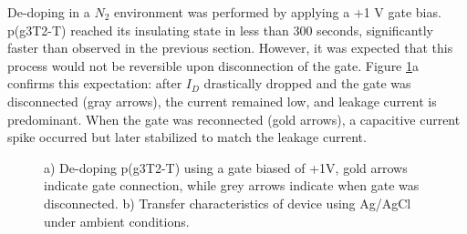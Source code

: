 De-doping in a $N_{2}$ environment was performed by applying a +1 V gate bias. p(g3T2-T) reached its insulating state in less than 300 seconds, significantly faster than observed in the previous section. However, it was expected that this process would not be reversible upon disconnection of the gate. Figure \ref{fig:revox2}a confirms this expectation: after $I_{D}$ drastically dropped and the gate was disconnected (gray arrows), the current remained low, and leakage current is predominant. When the gate was reconnected (gold arrows), a capacitive current spike occurred but later stabilized to match the leakage current.

\begin{figure}[ht]
    \centering
    \caption[Electrochemical de-doping of oxidized p(g3T2-T) OECT]{a) De-doping p(g3T2-T) using a gate biased of +1V, gold arrows indicate gate connection, while grey arrows indicate when gate was disconnected. b) Transfer characteristics of device using Ag/AgCl under ambient conditions.}
    \label{fig:revox2}
\end{figure}

